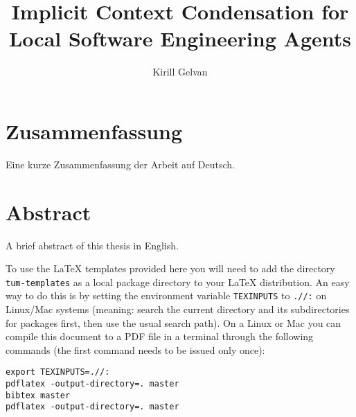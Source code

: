 \documentclass[%
thesis=student,%
coverpage=false,%
titlepage=false,%
headmarks=true, %
english,%
font=libertine, %
math=newpxtx, %
BCOR=5mm,%
coverBCOR=11mm%
]{tumbook}
\title{Implicit Context Condensation for Local Software Engineering Agents}
\author{Kirill Gelvan}
\begin{document}
\frontmatter
\maketitle

\section*{Zusammenfassung}
Eine kurze Zusammenfassung der Arbeit auf Deutsch.


\section*{Abstract}
A brief abstract of this thesis in English.


\cleardoublepage{}

\tableofcontents


\mainmatter{}


To use the \LaTeX{} templates provided here you will need to add the directory \verb|tum-templates| as a local package directory to your \LaTeX{} distribution. An easy way to do this is by setting the environment variable \verb|TEXINPUTS| to \verb|.//:| on Linux/Mac systems (meaning: search the current directory and its subdirectories for packages first, then use the usual search path). On a Linux or Mac you can compile this document to a PDF file in a terminal through the following commands (the first command needs to be issued only once):
\begin{verbatim}
export TEXINPUTS=.//:
pdflatex -output-directory=. master
bibtex master
pdflatex -output-directory=. master
\end{verbatim}











\backmatter{}
\listoffigures%
\listoftables%

\nocite{Alspach:2008,GaleShapley:1962} %
\printbibliography{} %
\end{document}

